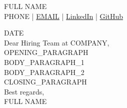 \documentclass[a4paper,10pt]{article}
\begin{document}
\begin{center}
    {\Huge FULL NAME} \\
    \vspace{0.1cm}
    {\small PHONE \quad | \quad \href{mailto:EMAIL}{EMAIL} \quad | \quad \href{LINKEDIN_URL}{LinkedIn} \quad | \quad \href{GITHUB_URL}{GitHub}}
\end{center}

\vspace{0.8cm}

\noindent DATE \\[0.4cm]

\noindent Dear Hiring Team at COMPANY, \\[0.3cm]

\noindent OPENING\_PARAGRAPH \\[0.3cm]

\noindent BODY\_PARAGRAPH\_1 \\[0.3cm]

\noindent BODY\_PARAGRAPH\_2 \\[0.3cm]

\noindent CLOSING\_PARAGRAPH \\[0.5cm]

\noindent Best regards, \\
FULL NAME
\end{document}
